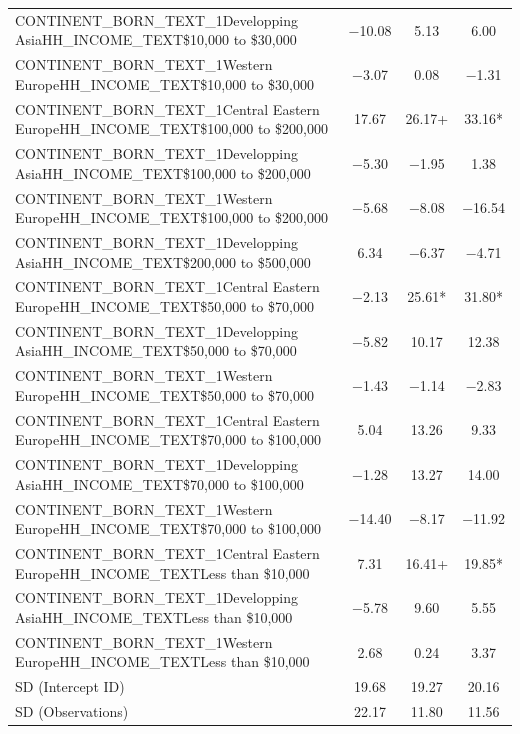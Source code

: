 \documentclass[]{report}
\begin{document}
\begin{table}
{\begin{tabular}[t]{lccc}
		CONTINENT\_BORN\_TEXT\_1Developping AsiaHH\_INCOME\_TEXT\$10,000 to \$30,000 & \num{-10.08} & \num{5.13} & \num{6.00}\\
		CONTINENT\_BORN\_TEXT\_1Western EuropeHH\_INCOME\_TEXT\$10,000 to \$30,000 & \num{-3.07} & \num{0.08} & \num{-1.31}\\
		CONTINENT\_BORN\_TEXT\_1Central Eastern EuropeHH\_INCOME\_TEXT\$100,000 to \$200,000 & \num{17.67} & \num{26.17}+ & \num{33.16}*\\
		CONTINENT\_BORN\_TEXT\_1Developping AsiaHH\_INCOME\_TEXT\$100,000 to \$200,000 & \num{-5.30} & \num{-1.95} & \num{1.38}\\
		CONTINENT\_BORN\_TEXT\_1Western EuropeHH\_INCOME\_TEXT\$100,000 to \$200,000 & \num{-5.68} & \num{-8.08} & \num{-16.54}\\
		CONTINENT\_BORN\_TEXT\_1Developping AsiaHH\_INCOME\_TEXT\$200,000 to \$500,000 & \num{6.34} & \num{-6.37} & \num{-4.71}\\
		CONTINENT\_BORN\_TEXT\_1Central Eastern EuropeHH\_INCOME\_TEXT\$50,000 to \$70,000 & \num{-2.13} & \num{25.61}* & \num{31.80}*\\
		CONTINENT\_BORN\_TEXT\_1Developping AsiaHH\_INCOME\_TEXT\$50,000 to \$70,000 & \num{-5.82} & \num{10.17} & \num{12.38}\\
		CONTINENT\_BORN\_TEXT\_1Western EuropeHH\_INCOME\_TEXT\$50,000 to \$70,000 & \num{-1.43} & \num{-1.14} & \num{-2.83}\\
		CONTINENT\_BORN\_TEXT\_1Central Eastern EuropeHH\_INCOME\_TEXT\$70,000 to \$100,000 & \num{5.04} & \num{13.26} & \num{9.33}\\
		CONTINENT\_BORN\_TEXT\_1Developping AsiaHH\_INCOME\_TEXT\$70,000 to \$100,000 & \num{-1.28} & \num{13.27} & \num{14.00}\\
		CONTINENT\_BORN\_TEXT\_1Western EuropeHH\_INCOME\_TEXT\$70,000 to \$100,000 & \num{-14.40} & \num{-8.17} & \num{-11.92}\\
		CONTINENT\_BORN\_TEXT\_1Central Eastern EuropeHH\_INCOME\_TEXTLess than \$10,000 & \num{7.31} & \num{16.41}+ & \num{19.85}*\\
		CONTINENT\_BORN\_TEXT\_1Developping AsiaHH\_INCOME\_TEXTLess than \$10,000 & \num{-5.78} & \num{9.60} & \num{5.55}\\
		CONTINENT\_BORN\_TEXT\_1Western EuropeHH\_INCOME\_TEXTLess than \$10,000 & \num{2.68} & \num{0.24} & \num{3.37}\\
		SD (Intercept ID) & \num{19.68} & \num{19.27} & \num{20.16}\\
		SD (Observations) & \num{22.17} & \num{11.80} & \num{11.56}\\

\end{tabular}}
\end{table}
\end{document}
